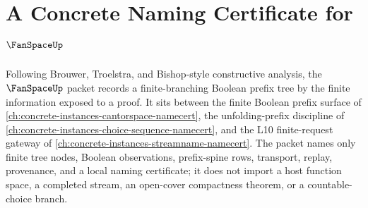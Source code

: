 \chapter{A Concrete Naming Certificate for $\FanSpaceUp$}
\label{ch:concrete-instances-fan-space-namecert}

Following Brouwer, Troelstra, and Bishop-style constructive analysis, the
$\FanSpaceUp$ packet records a finite-branching Boolean prefix tree by the
finite information exposed to a proof. It sits between the finite Boolean
prefix surface of \autoref{ch:concrete-instances-cantorspace-namecert}, the
unfolding-prefix discipline of
\autoref{ch:concrete-instances-choice-sequence-namecert}, and the L10
finite-request gateway of \autoref{ch:concrete-instances-streamname-namecert}.
The packet names only finite tree nodes, Boolean observations, prefix-spine
rows, transport, replay, provenance, and a local naming certificate; it does
not import a host function space, a completed stream, an open-cover
compactness theorem, or a countable-choice branch.

